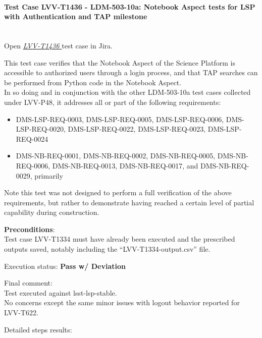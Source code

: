 \documentclass[DM,STR,toc]{lsstdoc}
\providecommand{\tightlist}{
  \setlength{\itemsep}{0pt}\setlength{\parskip}{0pt}}
\begin{document}
\paragraph{Test Case LVV-T1436 - LDM-503-10a: Notebook Aspect tests for LSP with Authentication and TAP
milestone
 }\mbox{}\\

Open  \href{https://jira.lsstcorp.org/secure/Tests.jspa#/testCase/LVV-T1436}{\textit{ LVV-T1436 } }
test case in Jira.

This test case verifies that the Notebook Aspect of the Science Platform
is accessible to authorized users through a login process, and that TAP
searches can be performed from Python code in the Notebook
Aspect.\\[2\baselineskip]In so doing and in conjunction with the other
LDM-503-10a test cases collected under LVV-P48, it addresses all or part
of the following requirements:

\begin{itemize}
\tightlist
\item
  DMS-LSP-REQ-0003, DMS-LSP-REQ-0005, DMS-LSP-REQ-0006,
  DMS-LSP-REQ-0020, DMS-LSP-REQ-0022, DMS-LSP-REQ-0023, DMS-LSP-REQ-0024
\item
  DMS-NB-REQ-0001, DMS-NB-REQ-0002, DMS-NB-REQ-0005, DMS-NB-REQ-0006,
  DMS-NB-REQ-0013, DMS-NB-REQ-0017, and DMS-NB-REQ-0029, primarily
\end{itemize}

Note this test was not designed to perform a full verification of the
above requirements, but rather to demonstrate having reached a certain
level of partial capability during construction.


\textbf{ Preconditions}:\\
Test case LVV-T1334 must have already been executed and the prescribed
outputs saved, notably including the ``LVV-T1334-output.csv'' file.


Execution status: {\bf Pass w/ Deviation }

Final comment:\\Test executed against lsst-lsp-stable.\\
No concerns except the same minor issues with logout behavior reported
for LVV-T622.



Detailed steps results:
\end{document}
